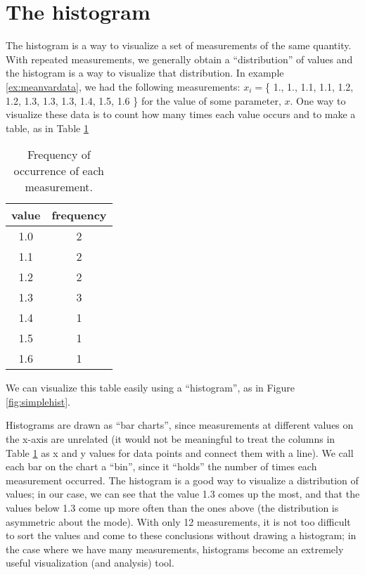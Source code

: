 \section{The histogram}
The histogram is a way to visualize a set of measurements of the same quantity. With repeated measurements, we generally obtain a ``distribution'' of values and the histogram is a way to visualize that distribution. In example \ref{ex:meanvardata}, we had the following measurements: $x_i=$\{ 1., 1., 1.1, 1.1, 1.2, 1.2, 1.3, 1.3, 1.3, 1.4, 1.5, 1.6 \} for the value of some parameter, $x$. One way to visualize these data is to count how many times each value occurs and to make a table, as in Table \ref{tab:measfreq}
\begin{table}[!ht]
\center
\begin{tabular}{|c|c|}
\hline
value & frequency\\
\hline
1.0 &2\\
\hline
1.1 &2\\
\hline
1.2 &2\\
\hline
1.3 &3\\
\hline
1.4 &1\\
\hline
1.5 &1\\
\hline
1.6 &1\\
\hline
\end{tabular}
\caption{\label{tab:measfreq}Frequency of occurrence of each measurement.}
\end{table}

We can visualize this table easily using a ``histogram'', as in Figure \ref{fig:simplehist}.

Histograms are drawn as ``bar charts'', since measurements at different values on the x-axis are unrelated (it would not be meaningful to treat the columns in Table \ref{tab:measfreq} as x and y values for data points and connect them with a line). We call each bar on the chart a ``bin'', since it ``holds'' the number of times each measurement occurred. The histogram is a good way to visualize a distribution of values; in our case, we can see that the value 1.3 comes up the most, and that the values below 1.3 come up more often than the ones above (the distribution is asymmetric about the mode). With only 12 measurements, it is not too difficult to sort the values and come to these conclusions without drawing a histogram; in the case where we have many measurements, histograms become an extremely useful visualization (and analysis) tool.

